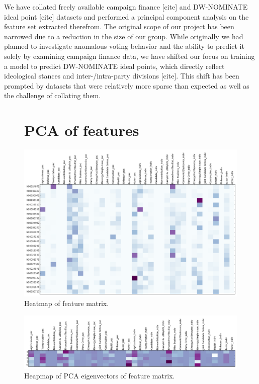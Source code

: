 \documentclass[10]{article}
\begin{document}
We have collated freely available campaign finance [cite] and DW-NOMINATE ideal point [cite] datasets and performed a principal component analysis on the feature set extracted therefrom. The original scope of our project has been narrowed due to a reduction in the size of our group. While originally we had planned to investigate anomalous voting behavior and the ability to predict it solely by examining campaign finance data, we have shifted our focus on training a model to predict DW-NOMINATE ideal points, which directly reflect ideological stances and inter-/intra-party divisions [cite]. This shift has been prompted by datasets that were relatively more sparse than expected as well as the challenge of collating them.\\

\begin{figure}[H]
\section*{PCA of features}
\centering
\includegraphics[width=.9\textwidth]{../../data/features/visualize/mod_2014_fm.png}
\caption{\label{fig:fmtrx}Heatmap of feature matrix.}
\end{figure}

\begin{figure}[H]
\centering
\includegraphics[width=.9\textwidth]{../../data/features/visualize/pcs.png}
\caption{\label{fig:fmtrx}Heapmap of PCA eigenvectors of feature matrix.}
\end{figure}
\end{document}
